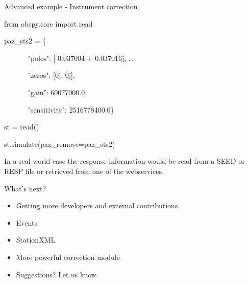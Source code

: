 \documentclass[handout]{beamer}
\begin{document}
\begin{frame}[plain]{Advanced example - Instrument correction}

\begin{myColorBox}{0.95}{}
\begin{semiverbatim}
from obspy.core import read


paz\_sts2 = \{

~ ~ ~ ~ "poles": [-0.037004 + 0.037016j, \dots

~ ~ ~ ~ "zeros": [0j, 0j],

~ ~ ~ ~ "gain": 60077000.0,

~ ~ ~ ~ "sensitivity": 2516778400.0\}


st = read()

st.simulate(paz\_remove=paz\_sts2)

\end{semiverbatim}
\end{myColorBox}
\vspace{1em}
In a real world case the response information would be read from a SEED or RESP file or retrieved from one of the webservices.


\end{frame}


\begin{frame}[plain]{What's next?}
    \begin{itemize}
            \item Getting more developers and external contributions
            \item Events
            \item StationXML
            \item More powerful correction module
            \item Suggestions? Let us know.
    \end{itemize}
\end{frame}
\end{document}
